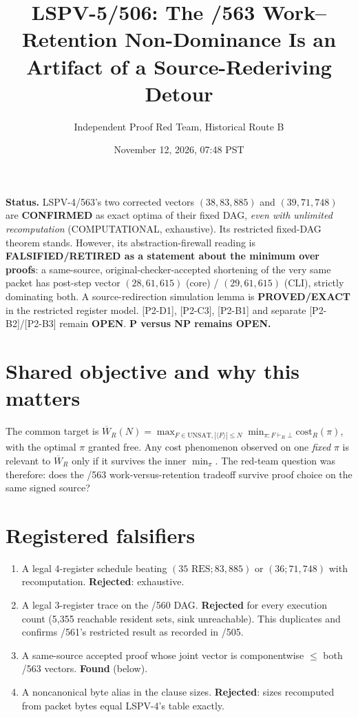 \documentclass[10pt]{article}
\title{LSPV-5/506: The /563 Work--Retention Non-Dominance Is an Artifact of a Source-Rederiving Detour}
\author{Independent Proof Red Team, Historical Route B}
\date{November 12, 2026, 07:48 PST}
\begin{document}
\maketitle
\noindent\textbf{Status.}
LSPV-4/563's two corrected vectors \((38,83,885)\) and \((39,71,748)\) are \textbf{CONFIRMED} as exact
optima of their fixed DAG, \emph{even with unlimited recomputation} (COMPUTATIONAL, exhaustive).
Its restricted fixed-DAG theorem stands.  However, its abstraction-firewall reading is
\textbf{FALSIFIED/RETIRED as a statement about the minimum over proofs}: a same-source, original-checker-accepted
shortening of the very same packet has post-step vector \((28,61,615)\) (core) / \((29,61,615)\) (CLI),
strictly dominating both.  A source-redirection simulation lemma is \textbf{PROVED/EXACT} in the restricted
register model.  [P2-D1], [P2-C3], [P2-B1] and separate [P2-B2]/[P2-B3] remain \textbf{OPEN}.
\textbf{P versus NP remains OPEN.}

\section*{Shared objective and why this matters}
The common target is \(\overline W_R(N)=\max_{F\in\mathrm{UNSAT},|\langle F\rangle|\le N}\min_{\pi:F\vdash_R\bot}\mathrm{cost}_R(\pi)\),
with the optimal \(\pi\) granted free.  Any cost phenomenon observed on one \emph{fixed} \(\pi\) is relevant to
\(\overline W_R\) only if it survives the inner \(\min_\pi\).  The red-team question was therefore: does the
/563 work-versus-retention tradeoff survive proof choice on the same signed source?

\section*{Registered falsifiers}
\begin{enumerate}
\item[F1] A legal 4-register schedule beating \((35\text{ RES};83,885)\) or \((36;71,748)\) with recomputation. \textbf{Rejected}: exhaustive.
\item[F2] A legal 3-register trace on the /560 DAG. \textbf{Rejected} for every execution count (5,355 reachable resident sets, sink unreachable). This duplicates and confirms /561's restricted result as recorded in /505.
\item[F3] A same-source accepted proof whose joint vector is componentwise \(\le\) both /563 vectors. \textbf{Found} (below).
\item[F4] A noncanonical byte alias in the clause sizes. \textbf{Rejected}: sizes recomputed from packet bytes equal LSPV-4's table exactly.
\end{enumerate}
\end{document}
